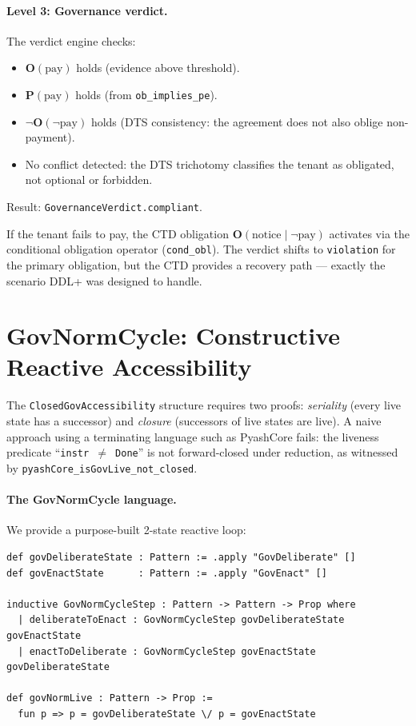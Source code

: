 \documentclass[]{article}
\newcommand{\code}[1]{\texttt{#1}}
\newcommand{\OB}{\ensuremath{\mathbf{O}}}
\newcommand{\PE}{\ensuremath{\mathbf{P}}}
\newcommand{\DDL}{\textup{DDL+}}
\newcommand{\DTS}{\textup{DTS}}
\begin{document}
\paragraph{Level 3: Governance verdict.}
The verdict engine checks:
\begin{itemize}
\item $\OB(\text{pay})$ holds (evidence above threshold).
\item $\PE(\text{pay})$ holds (from \code{ob\_implies\_pe}).
\item $\neg\OB(\neg\text{pay})$ holds (\DTS{} consistency: the agreement
      does not also oblige non-payment).
\item No conflict detected: the \DTS{} trichotomy classifies the tenant
      as obligated, not optional or forbidden.
\end{itemize}
Result: \code{GovernanceVerdict.compliant}.

If the tenant fails to pay, the CTD obligation $\OB(\text{notice} \mid \neg\text{pay})$
activates via the conditional obligation operator (\code{cond\_obl}).
The verdict shifts to \code{violation} for the primary obligation, but the
CTD provides a recovery path --- exactly the scenario \DDL{} was designed to handle.

\section{GovNormCycle: Constructive Reactive Accessibility}
\label{sec:govnorm}

The \code{ClosedGovAccessibility} structure requires two proofs:
\emph{seriality} (every live state has a successor) and
\emph{closure} (successors of live states are live).
A naive approach using a terminating language such as PyashCore fails:
the liveness predicate ``\code{instr $\neq$ Done}'' is not forward-closed under
reduction, as witnessed by \code{pyashCore\_isGovLive\_not\_closed}.

\paragraph{The GovNormCycle language.}
We provide a purpose-built 2-state reactive loop:

\begin{lstlisting}
def govDeliberateState : Pattern := .apply "GovDeliberate" []
def govEnactState      : Pattern := .apply "GovEnact" []

inductive GovNormCycleStep : Pattern -> Pattern -> Prop where
  | deliberateToEnact : GovNormCycleStep govDeliberateState govEnactState
  | enactToDeliberate : GovNormCycleStep govEnactState govDeliberateState

def govNormLive : Pattern -> Prop :=
  fun p => p = govDeliberateState \/ p = govEnactState
\end{lstlisting}
\end{document}
